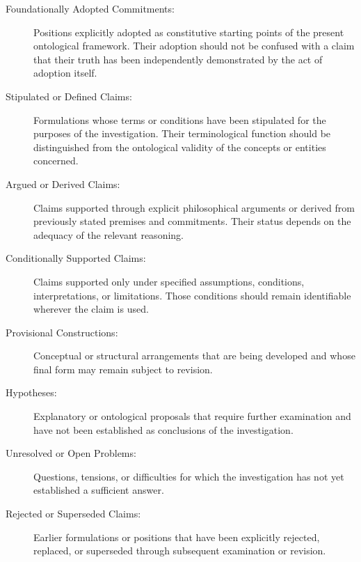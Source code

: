 \begin{description}

    \item[Foundationally Adopted Commitments:]
    Positions explicitly adopted as constitutive
    starting points of the present ontological
    framework. Their adoption should not be
    confused with a claim that their truth has
    been independently demonstrated by the act
    of adoption itself.

    \item[Stipulated or Defined Claims:]
    Formulations whose terms or conditions have
    been stipulated for the purposes of the
    investigation. Their terminological function
    should be distinguished from the ontological
    validity of the concepts or entities concerned.

    \item[Argued or Derived Claims:]
    Claims supported through explicit philosophical
    arguments or derived from previously stated
    premises and commitments. Their status depends
    on the adequacy of the relevant reasoning.

    \item[Conditionally Supported Claims:]
    Claims supported only under specified
    assumptions, conditions, interpretations,
    or limitations. Those conditions should
    remain identifiable wherever the claim
    is used.

    \item[Provisional Constructions:]
    Conceptual or structural arrangements that
    are being developed and whose final form
    may remain subject to revision.

    \item[Hypotheses:]
    Explanatory or ontological proposals that
    require further examination and have not
    been established as conclusions of the
    investigation.

    \item[Unresolved or Open Problems:]
    Questions, tensions, or difficulties for
    which the investigation has not yet established
    a sufficient answer.

    \item[Rejected or Superseded Claims:]
    Earlier formulations or positions that
    have been explicitly rejected, replaced,
    or superseded through subsequent examination
    or revision.

\end{description}

